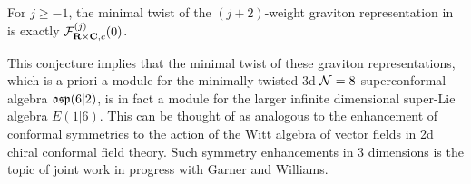 \documentclass[../main.tex]{subfiles}
\begin{document}
\begin{conj}\label{conj:e16gravitonrep}
For $j\geq -1$, the minimal twist of the $(j+2)$-weight graviton representation in \cite[Eq. (2.15, 2.16)]{Bhattacharya:2008zy} is exactly $\mathcal{F}^{(j)}_{\mathbf{R}\times \mathbf{C}, c}(0)$. 
\end{conj}

\begin{rmk}\label{rmk:e16enhance}
This conjecture implies that the minimal twist of these graviton representations, which is a priori a module for the minimally twisted 3d $\mathcal{N}=8$ superconformal algebra $\mathfrak{osp}(6|2)$, is in fact a module for the larger infinite dimensional super-Lie algebra $E(1|6)$. This can be thought of as analogous to the enhancement of conformal symmetries to the action of the Witt algebra of vector fields in 2d chiral conformal field theory. Such symmetry enhancements in 3 dimensions is the topic of joint work in progress with Garner and Williams.
\end{rmk}
\end{document}
